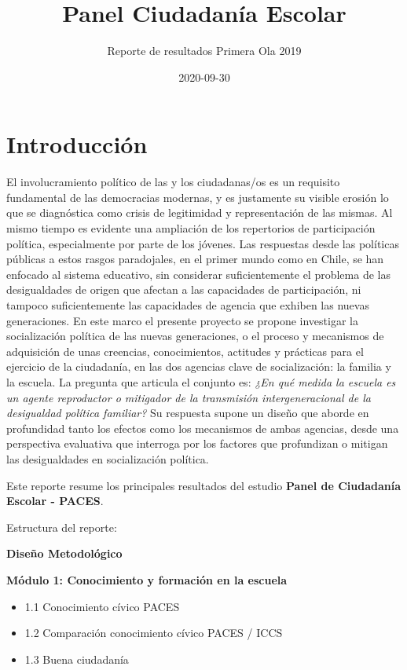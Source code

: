 \documentclass[
  14pt,
]{book}
\title{Panel Ciudadanía Escolar}
\subtitle{Reporte de resultados Primera Ola 2019}
\author{}
\date{\vspace{-2.5em}2020-09-30}
\providecommand{\tightlist}{%
  \setlength{\itemsep}{0pt}\setlength{\parskip}{0pt}}
\begin{document}
\maketitle

{
\setcounter{tocdepth}{1}
\tableofcontents
}
\hypertarget{introducciuxf3n}{%
\chapter*{Introducción}\label{introducciuxf3n}}

El involucramiento político de las y los ciudadanas/os es un requisito fundamental de las democracias modernas, y es justamente su visible erosión lo que se diagnóstica como crisis de legitimidad y representación de las mismas. Al mismo tiempo es evidente una ampliación de los repertorios de participación política, especialmente por parte de los jóvenes. Las respuestas desde las políticas públicas a estos rasgos paradojales, en el primer mundo como en Chile, se han enfocado al sistema educativo, sin considerar suficientemente el problema de las desigualdades de origen que afectan a las capacidades de participación, ni tampoco suficientemente las capacidades de agencia que exhiben las nuevas generaciones. En este marco el presente proyecto se propone investigar la socialización política de las nuevas generaciones, o el proceso y mecanismos de adquisición de unas creencias, conocimientos, actitudes y prácticas para el ejercicio de la ciudadanía, en las dos agencias clave de socialización: la familia y la escuela. La pregunta que articula el conjunto es: \emph{¿En qué medida la escuela es un agente reproductor o mitigador de la transmisión intergeneracional de la desigualdad política familiar?} Su respuesta supone un diseño que aborde en profundidad tanto los efectos como los mecanismos de ambas agencias, desde una perspectiva evaluativa que interroga por los factores que profundizan o mitigan las desigualdades en socialización política.

Este reporte resume los principales resultados del estudio \textbf{Panel de Ciudadanía Escolar - PACES}.

Estructura del reporte:

\textbf{Diseño Metodológico}

\textbf{Módulo 1: Conocimiento y formación en la escuela}

\begin{itemize}
\tightlist
\item
  1.1 Conocimiento cívico PACES
\item
  1.2 Comparación conocimiento cívico PACES / ICCS
\item
  1.3 Buena ciudadanía
\end{itemize}
\end{document}
